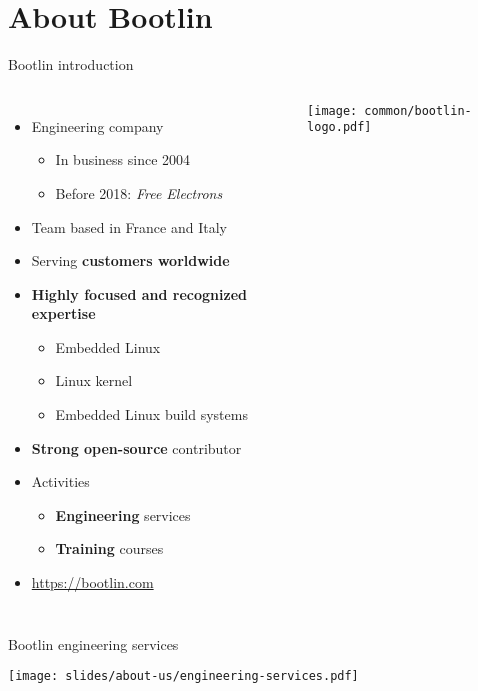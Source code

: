 \section{About Bootlin}

\begin{frame}{Bootlin introduction}
  \begin{columns}
  \begin{itemize}
  \item Engineering company
    \begin{itemize}
    \item In business since 2004
    \item Before 2018: {\em Free Electrons}
    \end{itemize}
  \item Team based in France and Italy
  \item Serving {\bf customers worldwide}
  \item {\bf Highly focused and recognized expertise}
    \begin{itemize}
    \item Embedded Linux
    \item Linux kernel
    \item Embedded Linux build systems
    \end{itemize}
  \item {\bf Strong open-source} contributor
  \item Activities
    \begin{itemize}
    \item {\bf Engineering} services
    \item {\bf Training} courses
    \end{itemize}
  \item {\small \url{https://bootlin.com}}
  \end{itemize}
  \begin{center}
    \texttt{[image: common/bootlin-logo.pdf]}
  \end{center}
  \end{columns}
\end{frame}

\begin{frame}{Bootlin engineering services}
  \begin{center}
    \texttt{[image: slides/about-us/engineering-services.pdf]}
  \end{center}
\end{frame}

